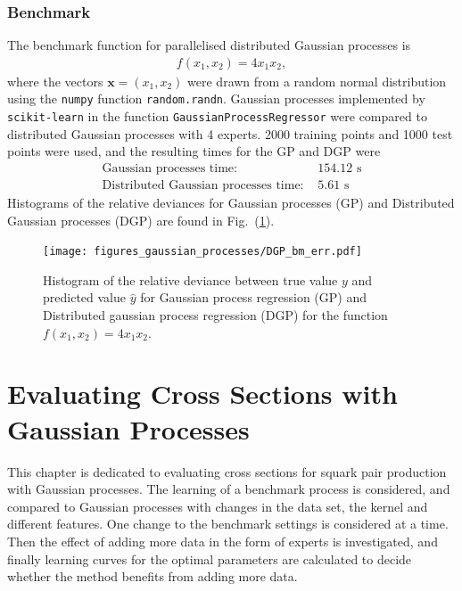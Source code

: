 \documentclass[twoside,english]{uiofysmaster}
\begin{document}
\subsection{Benchmark}

The benchmark function for parallelised distributed Gaussian processes is
\begin{align*}
f(x_1, x_2) =  4x_1x_2,
\end{align*}
where the vectors $\textbf{x} = (x_1, x_2)$ were drawn from a random normal distribution using the \verb|numpy| function \verb|random.randn|. Gaussian processes implemented by \verb|scikit-learn| in the function \verb|GaussianProcessRegressor| were compared to distributed Gaussian processes with 4 experts. 2000 training points and 1000 test points were used, and the resulting times for the GP and DGP were
\begin{align}
\text{Gaussian processes time: }& 154.12 \text{ s}\\
\text{Distributed Gaussian processes time: }& 5.61 \text{ s}
\end{align}
Histograms of the relative deviances for Gaussian processes (GP) and Distributed Gaussian processes (DGP) are found in Fig.\ (\ref{Fig:: gaussian process : DGP BM error histogram}).

\begin{figure}
\centering
\texttt{[image: figures\_gaussian\_processes/DGP\_bm\_err.pdf]}
\caption{Histogram of the relative deviance between true value $y$ and predicted value $\hat{y}$ for Gaussian process regression (GP) and Distributed gaussian process regression (DGP) for the function $f(x_1,x_2) = 4x_1 x_2$.}
\label{Fig:: gaussian process : DGP BM error histogram}
\end{figure}



\chapter{Evaluating Cross Sections with Gaussian Processes}

This chapter is dedicated to evaluating cross sections for squark pair production with Gaussian processes. The learning of a benchmark process is considered, and compared to Gaussian processes with changes in the data set, the kernel and different features. One change to the benchmark settings is considered at a time. Then the effect of adding more data in the form of experts is investigated, and finally learning curves for the optimal parameters are calculated to decide whether the method benefits from adding more data.
\end{document}
